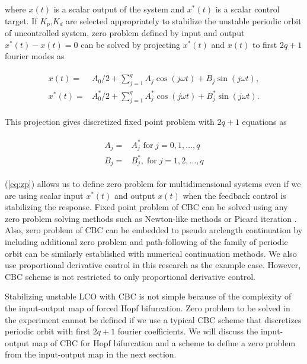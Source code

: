 \documentclass[openacc]{rsproca_new}%
\newcommand{\Eref}[1]{(\ref{#1})}
\begin{document}
\noindent where $x(t)$ is a scalar output of the system and $x^*(t)$ is a scalar control target. If $K_p$,$K_d$ are selected appropriately to stabilize the unstable periodic orbit of uncontrolled system, zero problem defined by input and output $x^*(t)-x(t)=0$ can be solved by projecting $x^*(t)$ and $x(t)$ to first $2q+1$ fourier modes as

\begin{align}
  \begin{split}
  x(t)=&A_0/2+  \sum_{j=1}^{q} A_j \cos (j\omega t)+B_j \sin (j\omega t),\\
  x^*(t)=&A_0^*/2+  \sum_{j=1}^{q} A^*_j \cos (j\omega t)+B^*_j \sin (j\omega t).
\end{split}
\end{align}

\noindent This projection gives discretized fixed point problem with $2q+1$ equations as

\begin{align}\label{eq:zp}
  \begin{split}
  A_j=&A^*_j \; \textrm{for} \; j=0,1,\ldots,q\\
  B_j=&B^*_j,\; \textrm{for} \; j=1,2,\ldots,q
\end{split}
\end{align}

\noindent \Eref{eq:zp} allows us to define zero problem for multidimensional systems even if we are using scalar input $x^*(t)$ and output $x(t)$ when the feedback control is stabilizing the response. Fixed point problem of CBC can be solved using any zero problem solving methods such as Newton-like methods \cite{schilder2015experimental} or Picard iteration \cite{barton2013systematic}. Also, zero problem of CBC can be embedded to pseudo arclength continuation by including additional zero problem and path-following of the family of periodic orbit can be similarly established with numerical continuation methods. We also use proportional derivative control in this research as the example case. However, CBC scheme is not restricted to only proportional derivative control.

Stabilizing unstable LCO with CBC is not simple because of the complexity of the input-output map of forced Hopf bifurcation. Zero problem to be solved in the experiment cannot be defined if we use a typical CBC scheme that discretizes periodic orbit with first $2q+1$ fourier coefficients. We will discuss the input-output map of CBC for Hopf bifurcation and a scheme to define a zero problem from the input-output map in the next section.
\end{document}
